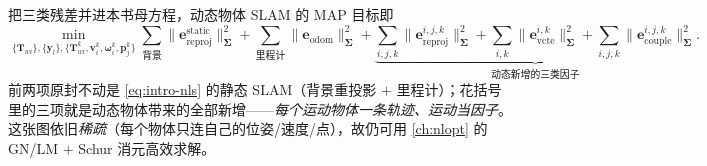 \begin{insight}[动态物体因子图 $=$ 母方程 $+$ 三类新因子]
把三类残差并进本书母方程，动态物体 SLAM 的 MAP 目标即
\begin{equation}
  \min_{\{\mathbf{T}_{wi}\},\{\mathbf{y}_l\},\{\mathbf{T}_{wi}^{k},\mathbf{v}_i^{k},\boldsymbol\omega_i^{k},\mathbf{p}_j^{k}\}}
  \sum_{\text{背景}}\!\big\|\mathbf{e}_{\mathrm{reproj}}^{\text{static}}\big\|^2_{\boldsymbol\Sigma}
  +\sum_{\text{里程计}}\!\big\|\mathbf{e}_{\mathrm{odom}}\big\|^2_{\boldsymbol\Sigma}
  +\underbrace{\sum_{i,j,k}\!\big\|\mathbf{e}_{\mathrm{reproj}}^{i,j,k}\big\|^2_{\boldsymbol\Sigma}
  +\sum_{i,k}\!\big\|\mathbf{e}_{\mathrm{vcte}}^{i,k}\big\|^2_{\boldsymbol\Sigma}
  +\sum_{i,j,k}\!\big\|\mathbf{e}_{\mathrm{couple}}^{i,j,k}\big\|^2_{\boldsymbol\Sigma}}_{\text{动态新增的三类因子}} .
  \label{eq:dyn-map}
\end{equation}
前两项原封不动是 \cref{eq:intro-nls} 的静态 SLAM（背景重投影 $+$ 里程计）；花括号里的三项就是动态物体带来的全部新增——\emph{每个运动物体一条轨迹、运动当因子}。这张图依旧\emph{稀疏}（每个物体只连自己的位姿/速度/点），故仍可用 \cref{ch:nlopt} 的 GN/LM $+$ Schur 消元高效求解。
\end{insight}

